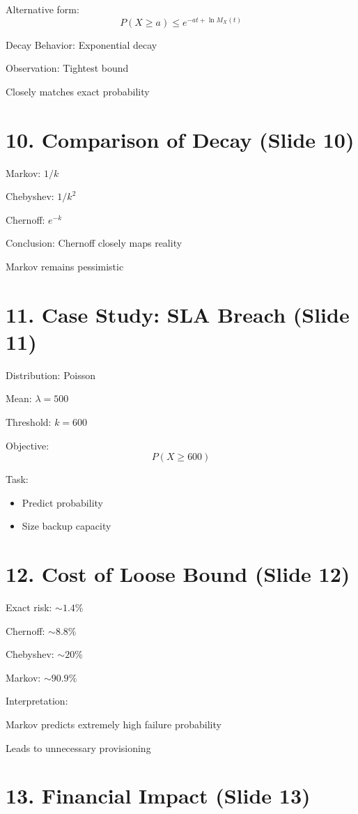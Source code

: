 \documentclass[12pt]{article}
\begin{document}
Alternative form:
\[
P(X \ge a) \le e^{-at + \ln M_X(t)}
\]

Decay Behavior: Exponential decay

Observation: Tightest bound

Closely matches exact probability

\section*{10. Comparison of Decay (Slide 10)}

Markov: $1/k$

Chebyshev: $1/k^2$

Chernoff: $e^{-k}$

Conclusion: Chernoff closely maps reality

Markov remains pessimistic

\section*{11. Case Study: SLA Breach (Slide 11)}

Distribution: Poisson

Mean: $\lambda = 500$

Threshold: $k = 600$

Objective:
\[
P(X \ge 600)
\]

Task:
\begin{itemize}
\item Predict probability
\item Size backup capacity
\end{itemize}

\section*{12. Cost of Loose Bound (Slide 12)}

Exact risk: $\sim 1.4\%$

Chernoff: $\sim 8.8\%$

Chebyshev: $\sim 20\%$

Markov: $\sim 90.9\%$

Interpretation:

Markov predicts extremely high failure probability

Leads to unnecessary provisioning

\section*{13. Financial Impact (Slide 13)}
\end{document}
